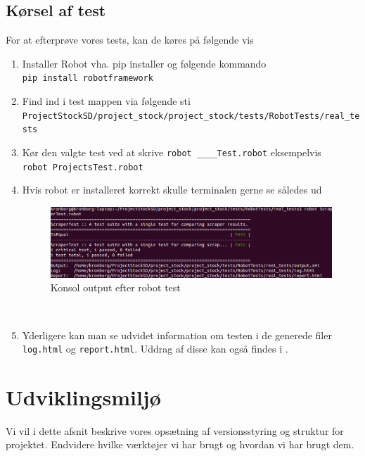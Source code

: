 \documentclass[12pt]{article}
\begin{document}
\subsection{Kørsel af test}
For at efterprøve vores tests, kan de køres på følgende vis
\begin{enumerate}
  \item Installer Robot vha. pip installer og følgende kommando\\
  \texttt{pip install robotframework}
  \item Find ind i test mappen via følgende sti \\ \texttt{ProjectStockSD/project\_stock/project\_stock/tests/RobotTests/real\_tests}
  \item Kør den valgte test ved at skrive \texttt{robot \_\_\_\_Test.robot} eksempelvis \\
  \texttt{robot ProjectsTest.robot}
  \item Hvis robot er installeret korrekt skulle terminalen gerne se således ud
    \begin{figure}[H]
        \centering
        \includegraphics[scale=0.5]{test.png}
        \caption{Konsol output efter robot test}
        \label{fig:console output}
    \end{figure}~
  \item Yderligere kan man se udvidet information om testen i de generede filer \texttt{log.html} og \texttt{report.html}. Uddrag af disse kan også findes i .
\end{enumerate}
\section{Udviklingsmiljø}
\label{sec:udvikling}
Vi vil i dette afsnit beskrive vores opsætning af versionsstyring og struktur for projektet. Endvidere hvilke værktøjer vi har brugt og hvordan vi har brugt dem.
\end{document}
